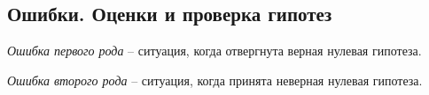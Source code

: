 
\subsection{Ошибки. Оценки и проверка гипотез}

\begin{definition}
  \emph{Ошибка первого рода} -- ситуация, когда отвергнута верная нулевая гипотеза.
\end{definition}

\begin{definition}
  \emph{Ошибка второго рода} -- ситуация, когда принята неверная нулевая гипотеза.
\end{definition}

